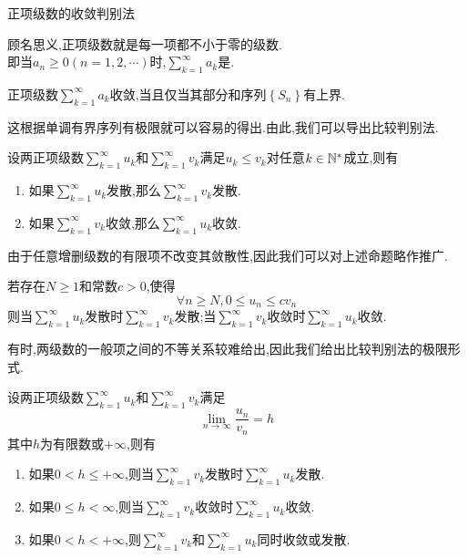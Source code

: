 \documentclass{ctexart}
\begin{document}
\pagestyle{empty}
\begin{center}\large 正项级数的收敛判别法\end{center}
\begin{definition}[1.1 定义:正项级数]
    顾名思义,正项级数就是每一项都不小于零的级数.\\
    即当$a_n\geqslant0(n=1,2,\cdots)$时,$\displaystyle\sum_{k=1}^{\infty}a_k$是.
\end{definition}
\noindent{}
\begin{formal}[2.1 正项级数收敛当且仅当有上界]
    正项级数$\displaystyle\sum_{k=1}^\infty a_k$收敛,当且仅当其部分和序列$\left\{S_n\right\}$有上界.
\end{formal}\noindent
这根据单调有界序列有极限就可以容易的得出.由此,我们可以导出比较判别法.
\begin{formal}[2.2 比较判别法I]
    设两正项级数$\displaystyle\sum_{k=1}^\infty u_k$和$\displaystyle\sum_{k=1}^\infty v_k$满足$u_k\leqslant v_k$对任意$k\in\mathbb{N}^*$成立,则有
    \begin{enumerate}[label=\tbf{\arabic*.}]
        \item 如果$\displaystyle\sum_{k=1}^\infty u_k$发散,那么$\displaystyle\sum_{k=1}^\infty v_k$发散.
        \item 如果$\displaystyle\sum_{k=1}^\infty v_k$收敛,那么$\displaystyle\sum_{k=1}^\infty u_k$收敛.
    \end{enumerate}
\end{formal}\noindent
由于任意增删级数的有限项不改变其敛散性,因此我们可以对上述命题略作推广.
\begin{formal}[2.2 比较判别法II]
    若存在$N\geqslant1$和常数$c>0$,使得
    \[\forall n\geqslant N,0\leqslant u_n\leqslant cv_n\]
    则当$\displaystyle\sum_{k=1}^\infty u_k$发散时$\displaystyle\sum_{k=1}^\infty v_k$发散;当$\displaystyle\sum_{k=1}^\infty v_k$收敛时$\displaystyle\sum_{k=1}^\infty u_k$收敛.
\end{formal}\noindent
有时,两级数的一般项之间的不等关系较难给出,因此我们给出比较判别法的极限形式.
\begin{formal}[2.3 比较判别法III]
    设两正项级数$\displaystyle\sum_{k=1}^\infty u_k$和$\displaystyle\sum_{k=1}^\infty v_k$满足
    \[\lim_{n\to\infty}\dfrac{u_n}{v_n}=h\]
    其中$h$为有限数或$+\infty$,则有
    \begin{enumerate}[label=\tbf{\arabic*.}]
        \item 如果$0<h\leqslant+\infty$,则当$\displaystyle\sum_{k=1}^\infty v_k$发散时$\displaystyle\sum_{k=1}^\infty u_k$发散.
        \item 如果$0\leqslant h<\infty$,则当$\displaystyle\sum_{k=1}^\infty v_k$收敛时$\displaystyle\sum_{k=1}^\infty u_k$收敛.
        \item 如果$0<h<+\infty$,则$\displaystyle\sum_{k=1}^\infty v_k$和$\displaystyle\sum_{k=1}^\infty u_k$同时收敛或发散.
    \end{enumerate}
\end{formal}
\end{document}

